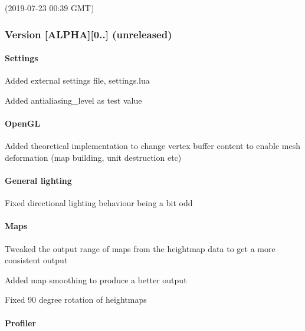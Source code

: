 (2019-\/07-\/23 00\+:39 G\+MT)

\subsubsection*{Version \mbox{[}A\+L\+P\+HA\mbox{]}\mbox{[}0..\mbox{]} (unreleased)}

\paragraph*{Settings}


\begin{DoxyItemize}
\item Added external settings file, \textquotesingle{}settings.\+lua\textquotesingle{}
\item Added \textquotesingle{}antialiasing\+\_\+level\textquotesingle{} as test value \paragraph*{Open\+GL}
\end{DoxyItemize}


\begin{DoxyItemize}
\item Added theoretical implementation to change vertex buffer content to enable mesh deformation (map building, unit destruction etc) \paragraph*{General lighting}
\end{DoxyItemize}


\begin{DoxyItemize}
\item Fixed directional lighting behaviour being a bit odd \paragraph*{Maps}
\end{DoxyItemize}


\begin{DoxyItemize}
\item Tweaked the output range of maps from the heightmap data to get a more consistent output
\item Added map smoothing to produce a better output
\item Fixed 90 degree rotation of heightmaps \paragraph*{Profiler}
\end{DoxyItemize}


